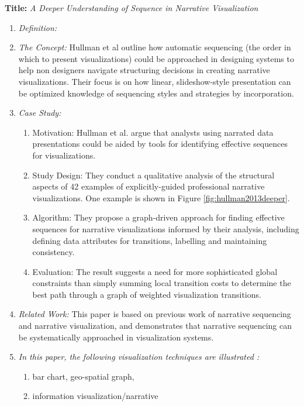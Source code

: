 \documentclass{egpubl}
\begin{document}
\textbf{Title:} \textit{A Deeper Understanding of Sequence in Narrative Visualization}
\begin{enumerate}
\item \textit{Definition:} 
\item \textit{The Concept:} Hullman et al\cite{hullman2013deeper} outline how automatic sequencing (the order in which to present visualizations) could be approached in designing systems to help non designers navigate structuring decisions in creating narrative visualizations. Their focus is on how linear, slideshow-style presentation can be optimized knowledge of sequencing styles and strategies by incorporation.
\item \textit{Case Study:}
\begin{enumerate}
\item Motivation: Hullman et al. argue that analysts using narrated data presentations could be aided by tools for identifying effective sequences for visualizations.
\item Study Design: They conduct a qualitative analysis of the structural aspects of 42 examples of explicitly-guided professional narrative visualizations. One example is shown in Figure \ref{fig:hullman2013deeper}.
\item Algorithm: They propose a graph-driven approach for finding effective sequences for narrative visualizations informed by their analysis, including defining data attributes for transitions, labelling and maintaining consistency.
\item Evaluation: The result suggests a need for more sophisticated global constraints than simply summing local transition costs to determine the best path through a graph of weighted visualization transitions.
\end{enumerate}
\item \textit{Related Work:} This paper is based on previous work of narrative sequencing\cite{black1979} and narrative visualization\cite{hullman,segal}, and demonstrates that narrative sequencing can be systematically approached in visualization systems.
\item \textit{In this paper, the following visualization techniques are illustrated :} 
\begin{enumerate}
\item bar chart, geo-spatial graph, 
\item information visualization/narrative
\end{enumerate}
\end{enumerate}
\end{document}
